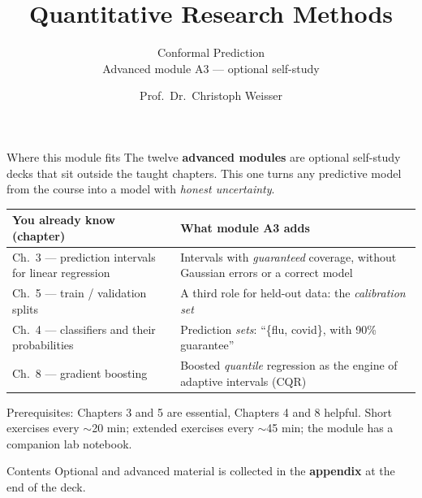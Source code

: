 \documentclass[aspectratio=169,11pt]{beamer}
\title{Quantitative Research Methods}
\subtitle{Conformal Prediction\\[2pt]{\small Advanced module A3 --- optional self-study}}
\author{Prof.\ Dr.\ Christoph Weisser}
\date{}\graphicspath{{images/}}
\begin{document}
\begin{frame}[plain]\titlepage\end{frame}

\begin{frame}{Where this module fits}
  \footnotesize
  The twelve \textbf{advanced modules} are optional self-study decks that sit outside
  the taught chapters. This one turns any predictive model from the course into a model
  with \emph{honest uncertainty}.
  \begin{center}
  \begin{tabular}{@{}p{4.6cm}p{8.6cm}@{}}
    \toprule
    \textbf{You already know (chapter)} & \textbf{What module A3 adds} \\
    \midrule
    Ch.\ 3 --- prediction intervals for linear regression &
      Intervals with \emph{guaranteed} coverage, without Gaussian errors or a correct
      model \\
    Ch.\ 5 --- train / validation splits &
      A third role for held-out data: the \emph{calibration set} \\
    Ch.\ 4 --- classifiers and their probabilities &
      Prediction \emph{sets}: ``\{flu, covid\}, with 90\% guarantee'' \\
    Ch.\ 8 --- gradient boosting &
      Boosted \emph{quantile} regression as the engine of adaptive intervals (CQR) \\
    \bottomrule
  \end{tabular}
  \end{center}
  \vspace{2pt}
  {\scriptsize Prerequisites: Chapters 3 and 5 are essential, Chapters 4 and 8 helpful.
  Short exercises every $\sim$20 min; extended exercises every $\sim$45 min; the module
  has a companion lab notebook.}
\end{frame}

\begin{frame}{Contents}\small\tableofcontents[hideallsubsections]
  \vfill
  {\tiny Optional and advanced material is collected in the \textbf{appendix} at the end of the deck.}
\end{frame}
\end{document}

